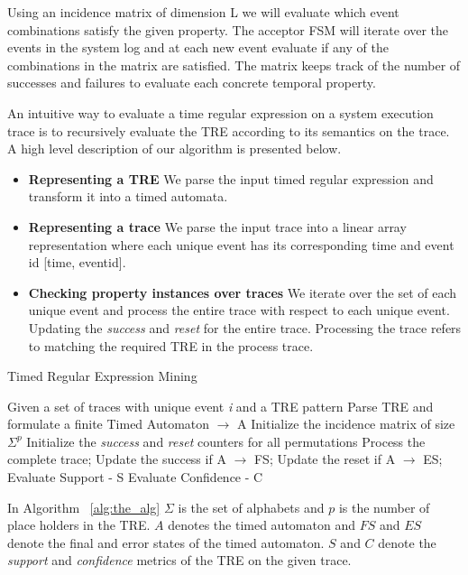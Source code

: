 \documentclass[]{sigplanconf}
\begin{document}
Using an incidence matrix of dimension L we will evaluate which event combinations satisfy the given property. The acceptor FSM will iterate over the events in the system log and at each new event evaluate if any of the combinations in the matrix are satisfied. The matrix keeps track of the number of successes and failures to evaluate each concrete temporal property.


An intuitive way to evaluate a time regular expression on a system execution trace is to recursively evaluate the TRE according to its semantics on the trace. A high level description of our algorithm is presented below.


\begin{itemize}
\item \textbf{Representing a TRE} We parse the input timed regular expression and transform it into a timed automata.
\item \textbf{Representing a trace} We parse the input trace into a  linear array representation where each unique event has its corresponding time and event id [time, eventid].
\item \textbf{Checking property instances over traces} We iterate over the set of each unique event and process the entire trace with respect to each unique event. Updating the \emph{success} and \emph{reset} for the entire trace. Processing the trace refers to matching the required TRE in the process trace.
\end{itemize}


\begin{algorithm}[h]
    \caption{Timed Regular Expression Mining}\label{alg:the_alg}
    \begin{algorithmic}[1]
     \Require  Given a set of traces with unique event \emph{i} and a TRE pattern
     \Ensure Parse TRE and formulate a finite Timed Automaton $\rightarrow$ A
     \State Initialize the incidence matrix of size $\Sigma^p$
     \State Initialize the \emph{success} and \emph{reset} counters for all permutations
        \State Process the complete trace;
        \State Update the success if A $\rightarrow$ FS;
        \State Update the reset if A $\rightarrow$ ES;
     \EndFor
     \State Evaluate Support - S
     \State Evaluate Confidence - C
    \end{algorithmic}
\end{algorithm}

In Algorithm ~\ref{alg:the_alg} $\Sigma$ is the set of alphabets and $p$ is the number of place holders in the TRE. $A$ denotes the timed automaton and $FS$ and $ES$ denote the final and error states of the timed automaton. $S$ and $C$ denote the \emph{support} and \emph{confidence} metrics of the TRE on the given trace.
\end{document}
